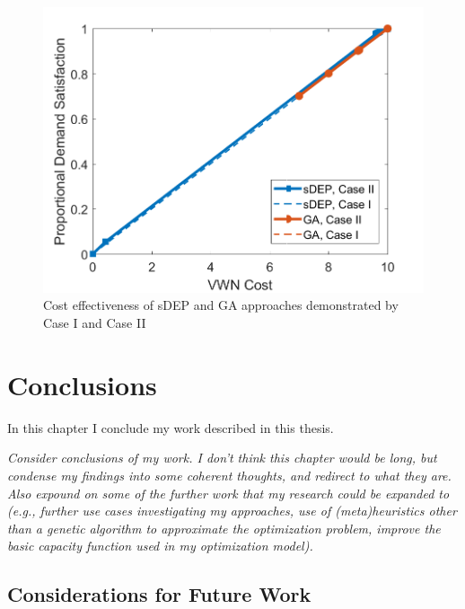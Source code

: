 \documentclass[12pt,dvipsnames]{report}
\begin{document}
\begin{figure}[htp]
	\centering
	\includegraphics[height=0.4\textheight]{Figures/CaseII_ComparisonCostvSat_CaseICaseII}
	\caption{Cost effectiveness of sDEP and GA approaches demonstrated by Case I and Case II}
	\label{fig:CaseII_ComparisonCostvSat_CaseICaseII}
\end{figure}

\fi

\iftrue
\pagebreak
\chapter{Conclusions} \label{ch:conc}

In this chapter I conclude my work described in this thesis.

%
\textit{Consider conclusions of my work.  I don't think this chapter would be long, but condense my findings into some coherent thoughts, and redirect to what they are.  Also expound on some of the further work that my research could be expanded to (e.g., further use cases investigating my approaches, use of (meta)heuristics other than a genetic algorithm to approximate the optimization problem, improve the basic capacity function used in my optimization model).}

\section{Considerations for Future Work} \label{sec:futurework}

\end{document}
